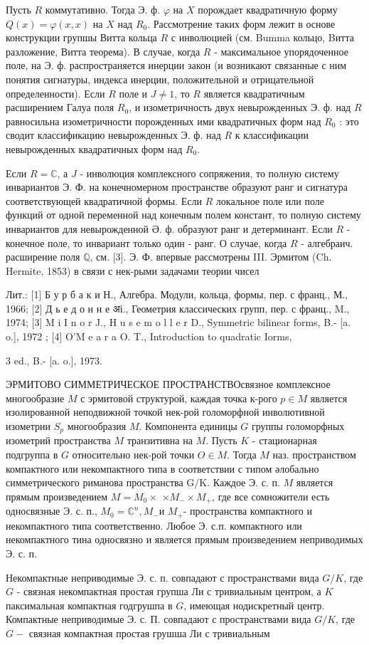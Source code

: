 \documentclass[10pt]{article}
\begin{document}
Пусть $R$ коммутативно. Тогда Э. ф. $\varphi$ на $X$ порождает квадратичную форму $Q(x)=\varphi(x, x)$ на $X$ над $R_{0}$. Рассмотрение таких форм лежит в основе конструкции групшы Витта кольца $R$ с инволюцией (см. Bumma кольцо, Bитта разложение, Витта теорема). В случае, когда $R$ - максимальное упорядоченное поле, на Э. ф. распространяется инерции закон (и возникают связанные с ним понятия сигнатуры, индекса инерции, положительной и отрицательной определенности). Если $R$ поле и $J \neq 1$, то $R$ является квадратичным расширением Галуа поля $R_{0}$, и изометричность двух невырожденных Э. ф. над $R$ равносильна изометричности порожденных ими квадратичных форм над $R_{0}$ : это сводит классификацию невырожденных Э. ф. над $R$ к классификации невырожденных квадратичных форм над $R_{0}$.



Если $R=\mathbb{C}$, а $J$ - инволюция комплексного сопряжения, то полную систему инвариантов Э. Ф. на конечномерном пространстве образуют ранг и сигнатура соответствующей квадратичной формы. Если $R$ локальное поле или поле функций от одной переменной над конечным полем констант, то полную систему инвариантов для невырожденной Ә. ф. образуют ранг и детерминант. Если $R$ - конечное поле, то инвариант только один - ранг. О случае, когда $R$ - алгебраич. расширение поля $\mathbb{Q}$, см. [3]. Э. Ф. впервые рассмотрены III. Эрмитом (Ch. Hermite, 1853) в связи с нек-рыми задачами теории чисел



Лит.: [1] Б у р б а к и Н., Алгебра. Модули, кольца, формы, пер. с франц., М., 1966; [2] Д ь е д о н н е अі., Геометрия классических групп, пер. с франц., M., 1974; [3] M i I n o r J., H u s e m o l l e r D., Symmetric bilinear forms, B.- [a. o.], 1972 ; [4] O'M e a r a O. T., Introduction to quadratic Iorms,

3 ed., B.- [a. o.], 1973.



ЭРМИТОВО СИММЕТРИЧЕСКОЕ ПРОСТРАНСТВОсвязное комплексное многообразие $M$ с эрмитовой структурой, каждая точка к-рого $p \in M$ является изолированной неподвижной точкой нек-рой голоморфной инволютивной изометрии $S_{p}$ многообразия $M$. Компонента единицы $G$ группы голоморфных изометрий пространства $M$ транзитивна на $M$. Пусть $K$ - стационарная подгруппа в $G$ относительно нек-рой точки $O \in M$. Тогда $M$ наз. пространством компактного или некомпактного типа в соответствии с типом әлобально симметрического риманова пространства G/K. Каждое Э. с. п. $M$ является прямым произведением $M=M_{0} \times$ $\times M_{-} \times M_{+}$, где все сомножители есть односвязные Э. с. п., $M_{0}=\mathbb{C}^{n}, M_{-}$и $M_{+}$- пространства компактного и некомпактного типа соответственно. Любое Э. с.п. компактного или некомпактного тина односвязно и является прямым произведением неприводимых Э. с. п.



Некомпактные неприводимые Э. с. п. совпадают с пространствами вида $G / K$, где $G$ - связная некомпактная простая групша Ли с тривиальным центром, а $K$ паксимальная компактная годгрушпа в $G$, имеющая нодискретный центр. Компактные неприводимые Э. с. П. совпадают с пространствами вида $G / K$, где $G-$ связная компактная простая грушша Ли с тривиальным
\end{document}
